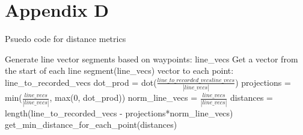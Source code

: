 %
%

\chapter{Appendix D}\label{app:app04}
Psuedo code for distance metrics
\begin{algorithm}
    Generate line vector segments based on waypoints: line_vecs
    Get a vector from the start of each line segment(line_vecs) vector to each point: line_to_recorded_vecs
    dot_prod = dot($\frac{line\_to\_recorded\_vecsline\_vecs}{|line\_vecs|}$)
    projections = min($\frac{line\_vecs}{|line\_vecs|}$, max(0, dot_prod))
    norm_line_vecs = $\frac{line\_vecs}{|line\_vecs|}$
    distances = length(line_to_recorded_vecs - projections*norm_line_vecs)
    get_min_distance_for_each_point(distances)

\end{algorithm}
